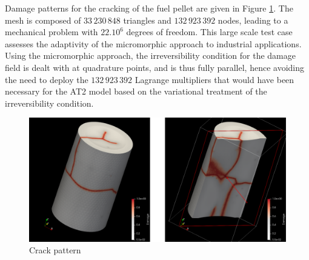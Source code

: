 Damage patterns for the cracking of the fuel pellet are given in Figure \ref{fig:micromorphic_damage:pellet_cracked}.
The mesh is composed of \(33\,230\,848\) triangles and \(132\,923\,392\) nodes, leading to a mechanical problem with
\(22.10^6\) degrees of freedom. This large scale test case assesses the adaptivity of the micromorphic approach to industrial
applications. Using the micromorphic approach, the irreversibility condition for the damage field is dealt with at quadrature points,
and is thus fully parallel, hence avoiding the need to deploy the \(132\,923\,392\) Lagrange multipliers that would have been necessary
for the AT2 model based on the variational treatment of the irreversibility condition.
%
%
%
\begin{figure}[H]
  \centering
  \includegraphics[width=14.cm]{../chapter_003_ef_micromorphic/figures/FuelPelletCracking-results.pdf}
  \caption{Crack pattern}
  \label{fig:micromorphic_damage:pellet_cracked}
\end{figure}